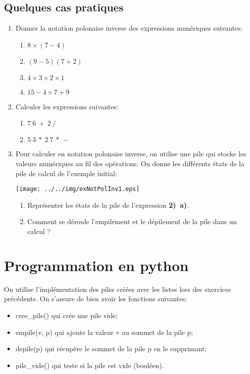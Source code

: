 \documentclass[11pt,a4paper]{article}
\begin{document}
\subsection*{Quelques cas pratiques}
\begin{enumerate}
\item Donner la notation polonaise inverse des expressions numériques suivantes:
\begin{enumerate}
\item $8 \times (7-4)$
\item $(9-5)(7+2)$
\item $4 \times 3 \times 2 \times 1$
\item $15-4\times 7 + 9$
\end{enumerate}
\item Calculer les expressions suivantes:
\begin{enumerate}
\item $7~6~+~2~/$
\item $5~3~*~2~7~*~-$
\end{enumerate}
\item Pour calculer en notation polonaise inverse, on utilise une pile qui stocke les valeurs numériques au fil des opérations. On donne les différents états de la pile de calcul de l'exemple initial:
\begin{center}
\texttt{[image: ../../img/exNotPolInv1.eps]}
\end{center}
\begin{enumerate}
\item Représenter les états de la pile de l'expression \textbf{2)~a)}.
\item Comment se déroule l'empilement et le dépilement de la pile dans un calcul ?
\end{enumerate}

\end{enumerate}


\section{Programmation en python}

On utilise l'implémentation des piles créées avec les listes lors des exercices précédents. On s'assure de bien avoir les fonctions suivantes:
\begin{itemize}
\item cree\_pile() qui crée une pile vide;
\item empile(v, p) qui ajoute la valeur v au sommet de la pile p;
\item depile(p) qui récupère le sommet de la pile p en le supprimant;
\item pile\_vide() qui teste si la pile est vide (booléen).
\end{itemize}\medskip
\end{document}
